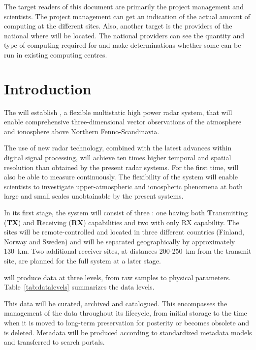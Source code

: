 \documentclass[12pt,a4paper]{article}
\begin{document}
The target readers of this document are primarily the \ED project management and scientists.
The \ED project management can get an indication of the actual amount of computing at the different \ED sites.
Also, another target is the providers of the national \einfras where \ED will be located.
The national \einfra providers can see the quantity and type of computing required for \ED and make determinations whether some can be run in existing computing centres.

\section{Introduction}
\label{intro}

The \ESA will establish \ED, a flexible multistatic high power radar system, that
will enable comprehensive three-dimensional vector observations of the atmosphere
and ionosphere above Northern Fenno-Scandinavia.  

The use of new radar technology, combined with the latest advances within digital signal processing,
will achieve ten times higher temporal and spatial resolution than
obtained by the present \EC radar systems. For the first time, \EC will also be able to measure continuously.  
The flexibility of the \ED system will enable scientists to investigate upper-atmospheric and 
ionospheric phenomena at both large and small scales unobtainable by the present systems.

In its first stage, the \ED system will consist of three \RSs:
one having both {\bf T}ransmitting ({\bf TX}) and {\bf R}eceiving ({\bf RX})
capabilities and two with only RX capability.  
The sites will
be remote-controlled and located in three different countries (Finland,
Norway and Sweden) and will be separated geographically by
approximately 130~km.  
Two additional receiver sites, at distances 200-250~km from the transmit site, 
are planned for the full \ED system at a later stage.

\ED will produce data at three levels, from raw samples to physical parameters. Table~\ref{tab:datalevels} summarizes the \ED data levels.

This data will be curated, archived and catalogued.
This encompasses the management of the data throughout
its lifecycle, from initial storage to the time when it is moved to
long-term preservation for posterity or becomes obsolete and is
deleted. Metadata will be produced according to standardized metadata models and transferred to search portals. 
\end{document}
